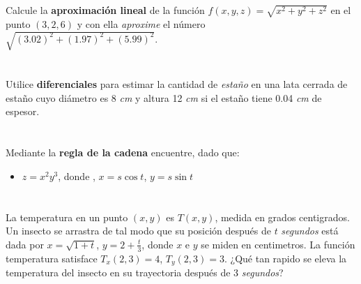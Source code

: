 \documentclass[12pt]{article}
\begin{document}
\section{}

Calcule la \textbf{aproximación lineal} de la función $f(x,y,z)=\sqrt{x^2+y^2+z^2}$ en el punto $(3,2,6)$ y con ella \textit{aproxime} el número $\sqrt{(3.02)^2+(1.97)^2+(5.99)^2}$.

\section{}

Utilice \textbf{diferenciales} para estimar la cantidad de \textit{estaño} en una lata cerrada de estaño cuyo diámetro es 8 \textit{cm} y altura 12 \textit{cm} si el estaño tiene
0.04 \textit{cm} de espesor.

\section{}

Mediante la \textbf{regla de la cadena} encuentre, dado que:

\begin{itemize}[format=\textbf]

\item $z=x^2y^3$, donde , $x=s \cos{t}$, $y=s \sin{t}$

\end{itemize}

\section{}

La temperatura en un punto $(x, y)$ es $T(x, y)$, medida en grados centigrados. Un insecto se arrastra de tal modo que su posición después de $t$ \textit{segundos} está dada por $x =
\sqrt{1 + t}$, $y = 2 + \frac{t}{3}$, donde $x$ e $y$ se miden en centimetros. La función temperatura satisface $T_x(2, 3) = 4$, $T_y(2, 3) = 3$.
¿Qué tan rapido se eleva la temperatura del insecto en su trayectoria después de 3 \textit{segundos}?
\end{document}
